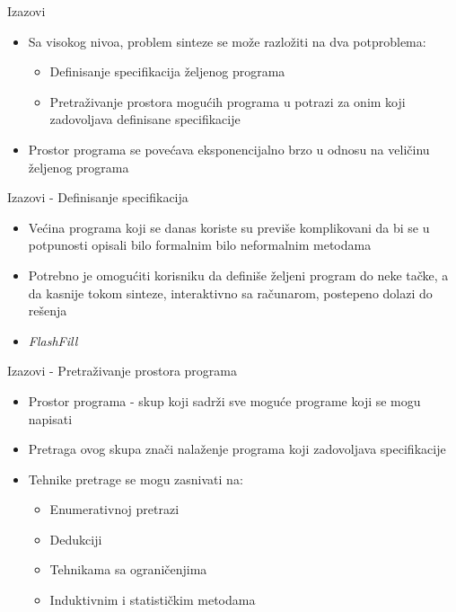 \documentclass{beamer}
\begin{document}
\begin{frame}{Izazovi}
    \begin{itemize}
        \item Sa visokog nivoa, problem sinteze se može razložiti na dva potproblema:
            \begin{itemize}
                \item Definisanje specifikacija željenog programa
                \item Pretraživanje prostora mogućih programa u potrazi za onim koji zadovoljava definisane specifikacije
            \end{itemize}
        \item Prostor programa se povećava eksponencijalno brzo u odnosu na veličinu željenog programa
    \end{itemize}
\end{frame}


\begin{frame}{Izazovi - Definisanje specifikacija}
    \begin{itemize}
        \item Većina programa koji se danas koriste su previše komplikovani da bi se u potpunosti opisali bilo formalnim bilo neformalnim metodama
        \item Potrebno je omogućiti korisniku da definiše željeni program do neke tačke, a da kasnije tokom sinteze, interaktivno sa računarom, postepeno dolazi do rešenja
        \item \emph{FlashFill}
    \end{itemize}
\end{frame}

\begin{frame}{Izazovi - Pretraživanje prostora programa}
    \begin{itemize}
        \item Prostor programa - skup koji sadrži sve moguće programe koji se mogu napisati
        \item Pretraga ovog skupa znači nalaženje programa koji zadovoljava specifikacije
        \item Tehnike pretrage se mogu zasnivati na:
            \begin{itemize}
                \item Enumerativnoj pretrazi
                \item Dedukciji
                \item Tehnikama sa ograničenjima
                \item Induktivnim i statističkim metodama
            \end{itemize}
    \end{itemize}
\end{frame}
\end{document}
